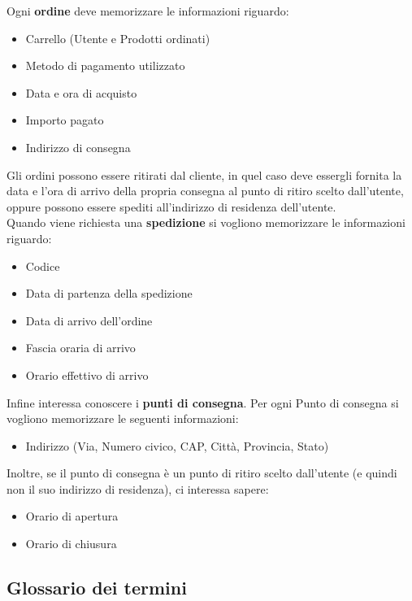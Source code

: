 \documentclass[11pt]{article}
\begin{document}
Ogni \textbf{ordine} deve memorizzare le informazioni riguardo:
\begin{itemize}
    \item Carrello (Utente e Prodotti ordinati)
    \item Metodo di pagamento utilizzato
    \item Data e ora di acquisto
    \item Importo pagato
    \item Indirizzo di consegna
\end{itemize}
Gli ordini possono essere ritirati dal cliente, in quel caso deve essergli fornita la data e l’ora di arrivo della propria consegna al punto di ritiro
scelto dall'utente, oppure possono essere spediti all'indirizzo di residenza dell'utente.\\
Quando viene richiesta una \textbf{spedizione} si vogliono memorizzare le informazioni riguardo:
\begin{itemize}
    \item Codice
    \item Data di partenza della spedizione
    \item Data di arrivo dell'ordine
    \item Fascia oraria di arrivo
    \item Orario effettivo di arrivo
\end{itemize}
Infine interessa conoscere i \textbf{punti di consegna}. Per ogni Punto di consegna si vogliono memorizzare le seguenti informazioni:
\begin{itemize}
    \item Indirizzo (Via, Numero civico, CAP, Città, Provincia, Stato)
\end{itemize}
Inoltre, se il punto di consegna è un punto di ritiro scelto dall'utente (e quindi non il suo indirizzo di residenza), ci interessa sapere:
\begin{itemize}
    \item Orario di apertura
    \item Orario di chiusura
\end{itemize}

\subsection{Glossario dei termini}
\end{document}

